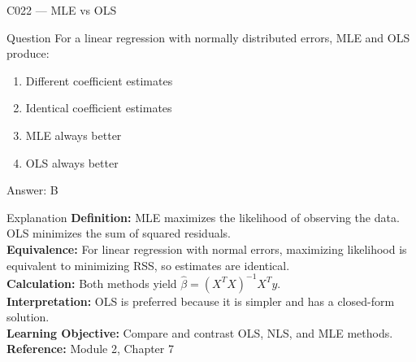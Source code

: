 \documentclass[aspectratio=169,8pt]{beamer}
\begin{document}
	\begin{frame}{C022 --- MLE vs OLS}
		\begin{block}{Question}
			For a linear regression with normally distributed errors, MLE and OLS produce:
			\begin{enumerate}
				\item Different coefficient estimates
				\item Identical coefficient estimates
				\item MLE always better
				\item OLS always better
			\end{enumerate}
		\end{block}
		\begin{exampleblock}{Answer: B}\end{exampleblock}
		\begin{block}{Explanation}
			\textbf{Definition:} MLE maximizes the likelihood of observing the data. OLS minimizes the sum of squared residuals.\\
			\textbf{Equivalence:} For linear regression with normal errors, maximizing likelihood is equivalent to minimizing RSS, so estimates are identical.\\
			\textbf{Calculation:} Both methods yield $\hat{\beta} = (X^TX)^{-1}X^Ty$.\\
			\textbf{Interpretation:} OLS is preferred because it is simpler and has a closed-form solution.\\
			\textbf{Learning Objective:} Compare and contrast OLS, NLS, and MLE methods.\\
			\textbf{Reference:} Module 2, Chapter 7
		\end{block}
	\end{frame}
	
\end{document}
